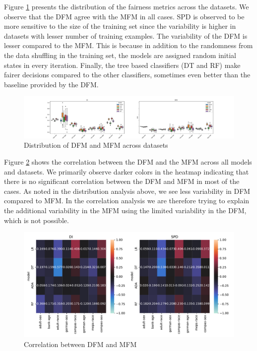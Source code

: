 \documentclass{article}
\begin{document}
Figure \ref{fig:boxplot-di-spd-full} presents the distribution of the
fairness metrics across the datasets. We observe that the DFM agree
with the MFM in all cases. SPD is observed to be more sensitive to the
size of the training set since the variability is higher in datasets
with lesser number of training examples. The variability of the DFM is
lesser compared to the MFM. This is because in addition to the
randomness from the data shuffling in the training set, the models are
assigned random initial states in every iteration. Finally, the tree
based classifiers (DT and RF) make fairer decisions compared to the
other classifiers, sometimes even better than the baseline provided by
the DFM.


\begin{figure}
  \centering
  \includegraphics[width=0.95\linewidth]{boxplot--dataset--di-spd--exp-full.pdf}
  \caption{Distribution of DFM and MFM across datasets}
  \label{fig:boxplot-di-spd-full}
\end{figure}

Figure \ref{fig:heatmap-corr-full-data} shows the correlation between
the DFM and the MFM across all models and datasets. We primarily
observe darker colors in the heatmap indicating that there is no
significant correlation between the DFM and MFM in most of the
cases. As noted in the distribution analysis above, we see less
variability in DFM compared to MFM. In the correlation analysis we are
therefore trying to explain the additional variability in the MFM
using the limited variability in the DFM, which is not possible.

\begin{figure}
  \centering
  \includegraphics[width=0.95\linewidth]{heatmap--corr--full-data.pdf}
  \caption{Correlation between DFM and MFM}
  \label{fig:heatmap-corr-full-data}
\end{figure}
\end{document}
